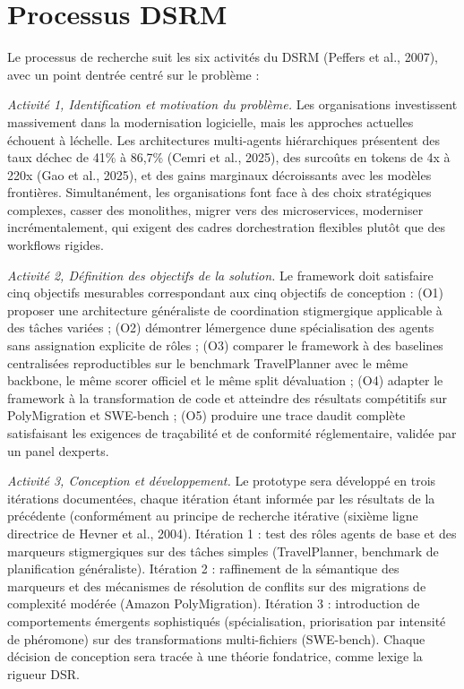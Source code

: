 \section{Processus DSRM}\label{processus-dsrm}

Le processus de recherche suit les six activités du DSRM (Peffers et al.,
2007), avec un point d\textquotesingle entrée centré sur le problème :

\emph{Activité 1, Identification et motivation du problème.}
Les organisations investissent massivement dans la modernisation logicielle,
mais les approches actuelles échouent à l\textquotesingle échelle. Les
architectures multi-agents hiérarchiques présentent des taux
d\textquotesingle échec de 41\% à 86,7\% (Cemri et al., 2025), des surcoûts
en tokens de 4x à 220x (Gao et al., 2025), et des gains marginaux
décroissants avec les modèles frontières. Simultanément, les organisations
font face à des choix stratégiques complexes, casser des monolithes,
migrer vers des microservices, moderniser incrémentalement, qui
exigent des cadres d\textquotesingle orchestration flexibles plutôt que
des workflows rigides.

\emph{Activité 2, Définition des objectifs de la solution.}
Le framework doit satisfaire cinq objectifs mesurables correspondant aux
cinq objectifs de conception : (O1) proposer une architecture
généraliste de coordination stigmergique applicable à des tâches variées ;
(O2) démontrer l\textquotesingle émergence d\textquotesingle une
spécialisation des agents sans assignation explicite de rôles ;
(O3) comparer le framework à des baselines centralisées reproductibles
sur le benchmark TravelPlanner avec le même backbone, le même scorer
officiel et le même split d\textquotesingle évaluation ;
(O4) adapter le framework à la transformation de code et atteindre des
résultats compétitifs sur PolyMigration et SWE-bench ;
(O5) produire une trace d\textquotesingle audit complète satisfaisant
les exigences de traçabilité et de conformité réglementaire, validée
par un panel d\textquotesingle experts.

\emph{Activité 3, Conception et développement.}
Le prototype sera développé en trois itérations documentées, chaque
itération étant informée par les résultats de la précédente (conformément
au principe de recherche itérative (sixième ligne directrice de Hevner
et al., 2004). Itération 1 : test des rôles agents de base et des
marqueurs stigmergiques sur des tâches simples (TravelPlanner, benchmark
de planification généraliste). Itération 2 : raffinement de la
sémantique des marqueurs et des mécanismes de résolution de conflits sur
des migrations de complexité modérée (Amazon PolyMigration). Itération
3 : introduction de comportements émergents sophistiqués
(spécialisation, priorisation par intensité de phéromone) sur des
transformations multi-fichiers (SWE-bench). Chaque décision de
conception sera tracée à une théorie fondatrice, comme
l\textquotesingle exige la rigueur DSR.

